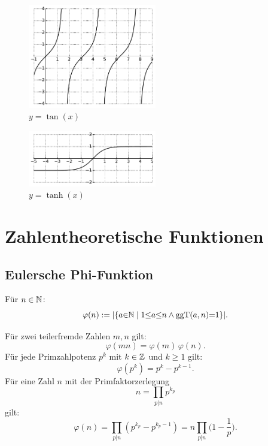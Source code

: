 \begin{figure}[h]
\includegraphics[width=0.5\textwidth]{img/tan.pdf}
\caption{$y=\tan(x)$}
\end{figure}

\begin{figure}[h]
\includegraphics[width=0.5\textwidth]{img/tanh.pdf}
\caption{$y=\tanh(x)$}
\end{figure}

\newpage
\section{Zahlentheoretische Funktionen}
\subsection{Eulersche Phi-Funktion}

\begin{definition}\mbox{}\newline
Für $n\in\mathbb N$:
\begin{equation}
\varphi(n) := |\{a{\in}\mathbb N\mid 1{\le}a{\le}n\wedge\operatorname{ggT}(a,n){=}1\}|.
\end{equation}
\end{definition}

\noindent
Für zwei teilerfremde Zahlen $m,n$ gilt:
\begin{equation}
\varphi(mn) = \varphi(m)\,\varphi(n).
\end{equation}
Für jede Primzahlpotenz $p^k$ mit $k\in\mathbb Z$ und $k\ge 1$ gilt:
\begin{equation}
\varphi(p^k) = p^k-p^{k-1}.
\end{equation}
Für eine Zahl $n$ mit der Primfaktorzerlegung
\begin{equation}
n=\prod_{p|n} p^{k_p}
\end{equation}
gilt:
\begin{equation}
\varphi(n) = \prod_{p|n} (p^{k_p}-p^{k_p-1})
= n\prod_{p|n} \Big(1-\frac{1}{p}\Big).
\end{equation}


